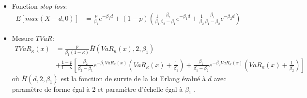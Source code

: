 \begin{itemize}
	\item Fonction \textit{stop-loss}: 
	\begin{align*}
	E[max(X-d,0)]
	&= \frac{p}{\beta_1} e^{-\beta_1 d} + (1-p) \left(\frac{1}{\beta_1}\frac{\beta_2}{\beta_2-\beta_1}e^{-\beta_1 d} + \frac{1}{\beta_2}\frac{\beta_1}{\beta_1-\beta_2}e^{-\beta_2 d}  \right)
	\end{align*}
	
	\item Mesure $TVaR$: 
	\begin{align*}
	TVaR_\kappa(x)&=
	\frac{p}{\beta_1(1-\kappa)} \bar{H}(VaR_\kappa(x),2,\beta_1) \\
	&+ \frac{1-p}{1-\kappa} \left[\frac{\beta_2}{\beta_2-\beta_1}e^{-\beta_1 VaR_\kappa(x)} \left( VaR_\kappa(x) + \frac{1}{\beta_1}\right) + \frac{\beta_1}{\beta_1-\beta_2}e^{-\beta_2 VaR_\kappa(x)} \left( VaR_\kappa(x) + \frac{1}{\beta_2}\right) \right]
	\end{align*}
	où $\bar{H}(d,2,\beta_1)$ est la fonction de survie de la loi Erlang évalué à $d$ avec paramètre de forme égal à 2 et paramètre d'échelle égal à $\beta_1$ .

\end{itemize}